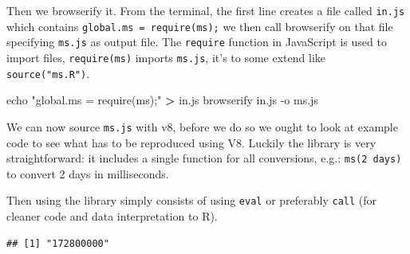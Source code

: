 \documentclass[
]{krantz}
\makeatletter
\newenvironment{Shaded}{\begin{snugshade}}{\end{snugshade}}
\newcommand{\BuiltInTok}[1]{#1}
\newcommand{\CommentTok}[1]{\textcolor[rgb]{0.37,0.37,0.37}{\textit{#1}}}
\newcommand{\ExtensionTok}[1]{#1}
\newcommand{\KeywordTok}[1]{\textcolor[rgb]{0.27,0.27,0.27}{\textbf{#1}}}
\newcommand{\NormalTok}[1]{#1}
\newcommand{\OperatorTok}[1]{\textcolor[rgb]{0.43,0.43,0.43}{\textbf{#1}}}
\newcommand{\StringTok}[1]{\textcolor[rgb]{0.5,0.5,0.5}{#1}}
\newenvironment{kframe}{%
\medskip{}
\setlength{\fboxsep}{.8em}
 \def\at@end@of@kframe{}%
 \ifinner\ifhmode%
  \def\at@end@of@kframe{\end{minipage}}%
  \begin{minipage}{\columnwidth}%
 \fi\fi%
 \def\FrameCommand##1{\hskip\@totalleftmargin \hskip-\fboxsep
 \colorbox{shadecolor}{##1}\hskip-\fboxsep
     \hskip-\linewidth \hskip-\@totalleftmargin \hskip\columnwidth}%
 \MakeFramed {\advance\hsize-\width
   \@totalleftmargin\z@ \linewidth\hsize
   \@setminipage}}%
 {\par\unskip\endMakeFramed%
 \at@end@of@kframe}
\renewenvironment{Shaded}{\begin{kframe}}{\end{kframe}}
\makeatother
\begin{document}
Then we browserify it. From the terminal, the first line creates a file called \texttt{in.js} which contains \texttt{global.ms\ =\ require(\textquotesingle{}ms\textquotesingle{});} we then call browserify on that file specifying \texttt{ms.js} as output file. The \texttt{require} function in JavaScript is used to import files, \texttt{require(\textquotesingle{}ms\textquotesingle{})} imports \texttt{ms.js}, it's to some extend like \texttt{source("ms.R")}.

\begin{Shaded}
\begin{Highlighting}[]
\BuiltInTok{echo} \StringTok{"global.ms = require(\textquotesingle{}ms\textquotesingle{});"} \OperatorTok{>}\NormalTok{ in.js}
\ExtensionTok{browserify}\NormalTok{ in.js {-}o ms.js}
\end{Highlighting}
\end{Shaded}

We can now source \texttt{ms.js} with v8, before we do so we ought to look at example code to see what has to be reproduced using V8. Luckily the library is very straightforward: it includes a single function for all conversions, e.g.: \texttt{ms(\textquotesingle{}2\ days\textquotesingle{})} to convert 2 days in milliseconds.

\begin{Shaded}
\end{Shaded}

Then using the library simply consists of using \texttt{eval} or preferably \texttt{call} (for cleaner code and data interpretation to R).

\begin{Shaded}
\end{Shaded}

\begin{verbatim}
## [1] "172800000"
\end{verbatim}

\begin{Shaded}
\end{Shaded}
\end{document}
